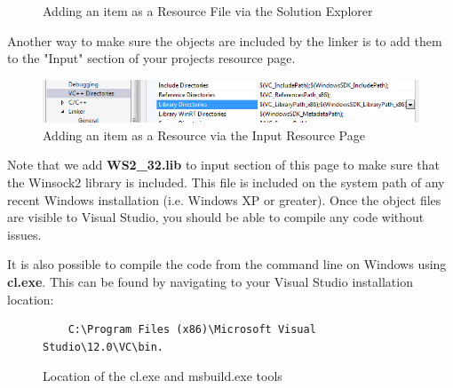  \begin{figure}[h]
 	\centering
 	\caption{Adding an item as a Resource File via the Solution Explorer}
 	\label{addingvsresource}
 \end{figure}
 
 Another way to make sure the objects are included by the linker is to add them to the "Input"
 section of your projects resource page.
 
 \begin{figure}[h]
 	\centering
 	\includegraphics[scale=0.50]{figures/windows_vs2012_static_linking_dirs.png}
 	\caption{Adding an item as a Resource via the Input Resource Page}
 	\label{usingtheinputresourcepage}
 \end{figure}
 
 Note that we add \textbf{WS2\_32.lib} to input section of this page to make sure that the Winsock2 library is included. This file is included on the system path of any recent Windows installation (i.e. Windows XP or greater). Once the object files are visible to Visual Studio, you should be able to compile any code without issues.
 
 It is also possible to compile the code from the command line on Windows using \textbf{cl.exe}. This can be found by navigating to your Visual Studio installation
 location:
 
 \begin{figure}[h]
 	\begin{lstlisting}
 	C:\Program Files (x86)\Microsoft Visual Studio\12.0\VC\bin.
 	\end{lstlisting}
 	\caption{Location of the cl.exe and msbuild.exe tools}
 \end{figure}
 
